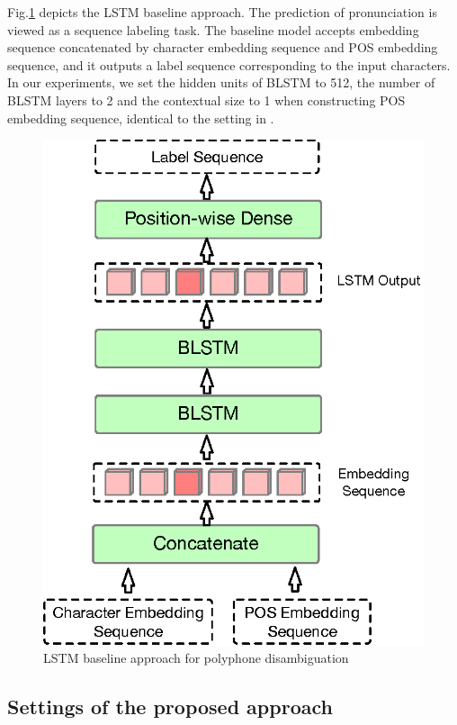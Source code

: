 \documentclass[a4paper]{article}
\begin{document}
Fig.\ref{fig:lstmbaseline} depicts the LSTM baseline approach. The prediction of pronunciation is viewed as a sequence labeling task. The baseline model accepts embedding sequence concatenated by character embedding sequence and POS embedding sequence, and it outputs a label sequence corresponding to the input characters. In our experiments, we set the hidden units of BLSTM to 512, the number of BLSTM layers to 2 and the contextual size to 1 when constructing POS embedding sequence, identical to the setting in \cite{shan2016bi}.



\begin{figure}[htbp]
	\centering
	\includegraphics[scale=0.4]{pics3/lstmbaseline2.eps}
	\caption{LSTM baseline approach for polyphone disambiguation}
	\label{fig:lstmbaseline}
\end{figure}

\subsection{Settings of the proposed approach}
\end{document}
